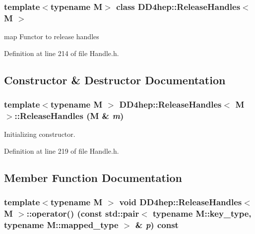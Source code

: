 \subsubsection*{template$<$typename M$>$ class DD4hep::ReleaseHandles$<$ M $>$}

map Functor to release handles 

Definition at line 214 of file Handle.h.

\subsection{Constructor \& Destructor Documentation}
\hypertarget{class_d_d4hep_1_1_release_handles_ab9f432d35b2e93e934d5346e9d7a3608}{
\subsubsection[{ReleaseHandles}]{\setlength{\rightskip}{0pt plus 5cm}template$<$typename M $>$ {\bf DD4hep::ReleaseHandles}$<$ M $>$::{\bf ReleaseHandles} (M \& {\em m})}}
\label{class_d_d4hep_1_1_release_handles_ab9f432d35b2e93e934d5346e9d7a3608}


Initializing constructor. 

Definition at line 219 of file Handle.h.

\subsection{Member Function Documentation}
\hypertarget{class_d_d4hep_1_1_release_handles_ae19d6f7d216512507c1cc64dcf8f7a38}{
\subsubsection[{operator()}]{\setlength{\rightskip}{0pt plus 5cm}template$<$typename M $>$ void {\bf DD4hep::ReleaseHandles}$<$ M $>$::operator() (const std::pair$<$ typename M::key\_\-type, typename M::mapped\_\-type $>$ \& {\em p}) const}}
\label{class_d_d4hep_1_1_release_handles_ae19d6f7d216512507c1cc64dcf8f7a38}


